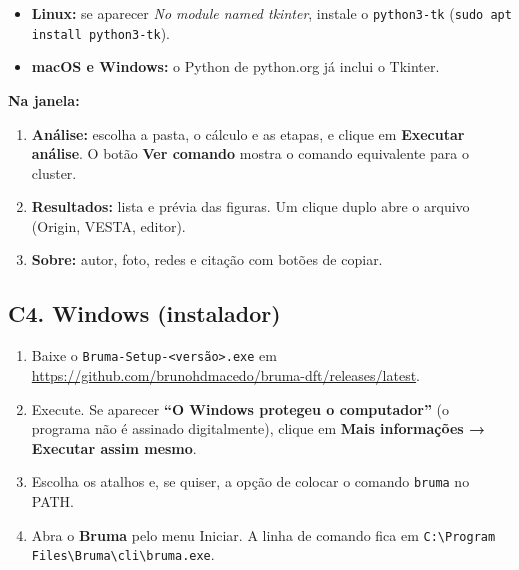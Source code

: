 \documentclass[
  10pt,
]{article}
\providecommand{\tightlist}{%
  \setlength{\itemsep}{0pt}\setlength{\parskip}{0pt}}
\begin{document}
\begin{itemize}
\tightlist
\item
  \textbf{Linux:} se aparecer \emph{No module named tkinter}, instale o
  \texttt{python3-\allowbreak{}tk}
  (\texttt{sudo apt install python3-\allowbreak{}tk}).
\item
  \textbf{macOS e Windows:} o Python de python.org já inclui o Tkinter.
\end{itemize}

\textbf{Na janela:}

\begin{enumerate}
\def\labelenumi{\arabic{enumi}.}
\tightlist
\item
  \textbf{Análise:} escolha a pasta, o cálculo e as etapas, e clique em
  \textbf{Executar análise}. O botão \textbf{Ver comando} mostra o
  comando equivalente para o cluster.
\item
  \textbf{Resultados:} lista e prévia das figuras. Um clique duplo abre
  o arquivo (Origin, VESTA, editor).
\item
  \textbf{Sobre:} autor, foto, redes e citação com botões de copiar.
\end{enumerate}

\hypertarget{c4.-windows-instalador}{%
\subsection{C4. Windows (instalador)}\label{c4.-windows-instalador}}

\begin{enumerate}
\def\labelenumi{\arabic{enumi}.}
\tightlist
\item
  Baixe o
  \texttt{Bruma-\allowbreak{}Setup-\allowbreak{}<versão>.\allowbreak{}exe}
  em \url{https://github.com/brunohdmacedo/bruma-dft/releases/latest}.
\item
  Execute. Se aparecer \textbf{``O Windows protegeu o computador''} (o
  programa não é assinado digitalmente), clique em \textbf{Mais
  informações → Executar assim mesmo}.
\item
  Escolha os atalhos e, se quiser, a opção de colocar o comando
  \texttt{bruma} no PATH.
\item
  Abra o \textbf{Bruma} pelo menu Iniciar. A linha de comando fica em
  \texttt{C:\allowbreak{}\textbackslash\allowbreak{}Program Files\textbackslash\allowbreak{}Bruma\textbackslash\allowbreak{}cli\textbackslash\allowbreak{}bruma.\allowbreak{}exe}.
\end{enumerate}
\end{document}
